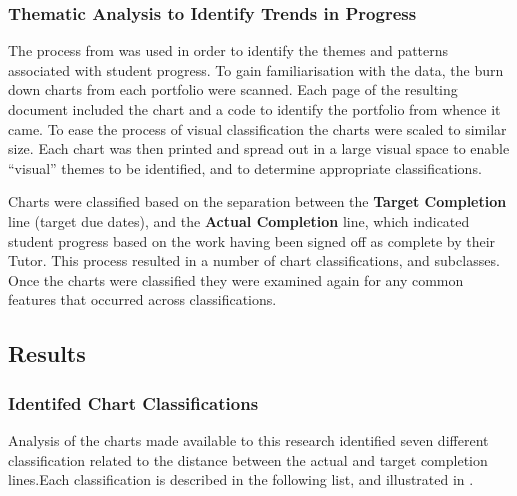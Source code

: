 
\subsubsection{Thematic Analysis to Identify Trends in Progress} %
\label{sub:approach_to_analysis}

The process from  was used in order to identify the themes and patterns associated with student progress. To gain familiarisation with the data, the burn down charts from each portfolio were scanned. Each page of the resulting document included the chart and a code to identify the portfolio from whence it came. To ease the process of visual classification the charts were scaled to similar size. Each chart was then printed and spread out in a large visual space to enable ``visual'' themes to be identified, and to determine appropriate classifications. 

Charts were classified based on the separation between the \textbf{Target Completion} line (target due dates), and the \textbf{Actual Completion} line, which indicated student progress based on the work having been signed off as complete by their Tutor. This process resulted in a number of chart classifications, and subclasses. Once the charts were classified they were examined again for any common features that occurred across classifications. 


\subsection{Results} %
\label{sec:progress_results}

\subsubsection{Identifed Chart Classifications} %
\label{sub:identified_chart_classifications}

Analysis of the charts made available to this research identified seven different classification related to the distance between the actual and target completion lines.Each classification is described in the following list, and illustrated in .

